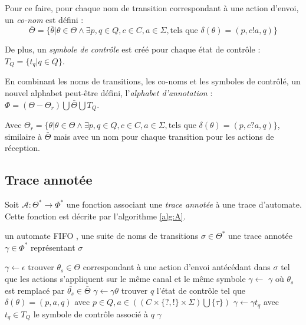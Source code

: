 Pour ce faire, pour chaque nom de transition correspondant à une action d'envoi, un \emph{co-nom} est défini :
$$
\bar{\Theta}=\{\bar{\theta}|\theta\in\Theta\wedge\exists p,q \in Q, c\in C, a\in\Sigma,\text{tels que } \delta(\theta)=(p,c!a,q)\}
$$

De plus, un \emph{symbole de contrôle} est créé pour chaque état de contrôle : $T_Q = \{t_q | q\in Q\}$.

En combinant les noms de transitions, les co-noms et les symboles de contrôlé, un nouvel alphabet peut-être défini, l'\emph{alphabet d'annotation} : $\Phi=(\Theta-\Theta_r)\bigcup\bar{\Theta}\bigcup T_Q$.

Avec $\Theta_r=\{\theta|\theta\in\Theta\wedge\exists p,q \in Q, c\in C, a\in\Sigma,\text{tels que } \delta(\theta)=(p,c?a,q)\}$, similaire à $\bar{\Theta}$ mais avec un nom pour chaque transition pour les actions de réception.


\subsection{Trace annotée}


Soit $\mathcal{A}:\Theta^*\rightarrow\Phi^*$ une fonction associant une \emph{trace annotée} à une trace d'automate. Cette fonction est décrite par l'algorithme \ref{alg:A}.


\begin{algorithm}[H]
  	\begin{algorithmic}[1]
    \REQUIRE un automate FIFO \fifo , une suite de noms de transitions $\sigma\in\Theta^*$
		\ENSURE une trace annotée $\gamma\in\Phi^*$ représentant $\sigma$

    \STATE $\gamma\leftarrow\epsilon$
        \STATE trouver $\theta_s\in\Theta$ correspondant à une action d'envoi antécédant dans $\sigma$ tel que les actions s'appliquent sur le même canal et le même symbole
        \STATE $\gamma\leftarrow$ $\gamma$ où $\theta_s$ est remplacé par $\bar{\theta_s}\in\bar{\Theta}$ 
        \STATE $\gamma\leftarrow\gamma\theta$
      \ENDIF
    \ENDFOR
    \STATE trouver $q$ l'état de contrôle tel que $\delta(\theta)=(p,a,q)$ avec $p\in Q,a\in((C \times \{?,!\} \times \Sigma) \bigcup \{\tau\})$
    \STATE $\gamma\leftarrow\gamma t_q$ avec $t_q\in T_Q$ le symbole de contrôle associé à $q$
		\RETURN $\gamma$
	\end{algorithmic}
	\caption{$\mathcal{A}:\Theta^*\rightarrow\Phi^*$}\label{alg:A}
\end{algorithm}

